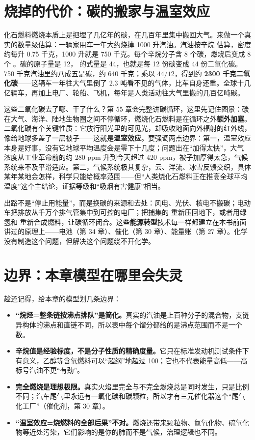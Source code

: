 \section{烧掉的代价：碳的搬家与温室效应}

化石燃料燃烧本质上是把埋了几亿年的碳，在几百年里集中搬回大气。来做一个真实的数量级估算：一辆家用车一年大约烧掉 1000 升汽油。汽油按辛烷  估算，密度约每升 0.75 千克，1000 升就是 750 千克。每个辛烷分子含 8 个碳，燃烧后变成 8 个 。碳的原子量是 12， 的式量是 44，也就是每 12 份碳变成 44 份二氧化碳。750 千克汽油里约八成五是碳，约 640 千克；乘以 $44/12$，得到约 \textbf{2300 千克二氧化碳}——这辆车一年往大气里倒了 2.3 吨看不见的气体，比车自身还重。全球十几亿辆车，再加上电厂、轮船、飞机，每年是人类活动往大气里搬的几百亿吨碳。

这些二氧化碳去了哪、干了什么？第 55 章会完整讲碳循环，这里先记住图景：碳在大气、海洋、陆地生物圈之间不停循环，燃烧化石燃料是在循环之外\textbf{额外加塞}。二氧化碳有个关键性质：它放行阳光里的可见光，却吸收地面向外辐射的红外线，像给地球多盖了一层被子——这就是\textbf{温室效应}。要强调两点边界：第一，温室效应本身是好事，没有它地球平均温度会是零下十几度；问题出在“加得太快”，大气  浓度从工业革命前的约 280 ppm 升到今天超过 420 ppm，被子加厚得太急，气候系统来不及平滑适应。第二，气候系统极其复杂，云、洋流、冰雪反馈交织，具体某年某地会怎样，科学只能给概率范围——但“人类烧化石燃料正在推高全球平均温度”这个主结论，证据等级和“吸烟有害健康”相当。

出路不是“停止用能量”，而是换碳的来源和去处：风电、光伏、核电不搬碳；电动车把排放从千万个排气管集中到可控的电厂；把捕集的  重新压回地下，或者用绿氢和  重新合成燃料，让碳循环闭合。这些\textbf{能源转型}技术每一样都建立在本书前面讲过的原理上——电池（第 34 章）、催化（第 30 章）、能量账（第 27 章）。化学没有制造这个问题，但解决这个问题绕不开化学。

\section{边界：本章模型在哪里会失灵}

趁还记得，给本章的模型划几条边界：

\begin{itemize}[itemsep=2pt]
\item \textbf{“烷烃=整条链按沸点排队”是简化。}真实的汽油是上百种分子的混合物，支链异构体的沸点和直链不同，所以表中每个馏分都给的是沸点范围而不是一个数。
\item \textbf{辛烷值是经验标度，不是分子性质的精确度量。}它只在标准发动机测试条件下有意义，乙醇等含氧燃料可以“超纲”地超过 100；它也不代表能量高低——高标号汽油不更“有劲”。
\item \textbf{完全燃烧是理想极限。}真实火焰里完全与不完全燃烧总是同时发生，只是比例不同；汽车尾气里永远有一氧化碳和碳颗粒，所以才有三元催化器这个“尾气化工厂”（催化剂，第 30 章）。
\item \textbf{“温室效应=烧燃料的全部后果”不对。}燃烧还带来颗粒物、氮氧化物、硫氧化物等近处污染，它们影响的是你的肺而不是气候，治理逻辑也不同。
\end{itemize}

